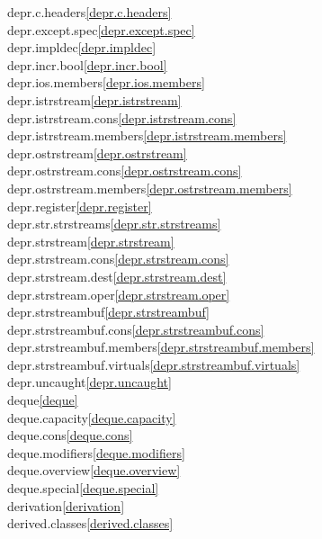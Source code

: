 \begin{multicols}{2}
depr.c.headers\quad\ref{depr.c.headers}\\
depr.except.spec\quad\ref{depr.except.spec}\\
depr.impldec\quad\ref{depr.impldec}\\
depr.incr.bool\quad\ref{depr.incr.bool}\\
depr.ios.members\quad\ref{depr.ios.members}\\
depr.istrstream\quad\ref{depr.istrstream}\\
depr.istrstream.cons\quad\ref{depr.istrstream.cons}\\
depr.istrstream.members\quad\ref{depr.istrstream.members}\\
depr.ostrstream\quad\ref{depr.ostrstream}\\
depr.ostrstream.cons\quad\ref{depr.ostrstream.cons}\\
depr.ostrstream.members\quad\ref{depr.ostrstream.members}\\
depr.register\quad\ref{depr.register}\\
depr.str.strstreams\quad\ref{depr.str.strstreams}\\
depr.strstream\quad\ref{depr.strstream}\\
depr.strstream.cons\quad\ref{depr.strstream.cons}\\
depr.strstream.dest\quad\ref{depr.strstream.dest}\\
depr.strstream.oper\quad\ref{depr.strstream.oper}\\
depr.strstreambuf\quad\ref{depr.strstreambuf}\\
depr.strstreambuf.cons\quad\ref{depr.strstreambuf.cons}\\
depr.strstreambuf.members\quad\ref{depr.strstreambuf.members}\\
depr.strstreambuf.virtuals\quad\ref{depr.strstreambuf.virtuals}\\
depr.uncaught\quad\ref{depr.uncaught}\\
deque\quad\ref{deque}\\
deque.capacity\quad\ref{deque.capacity}\\
deque.cons\quad\ref{deque.cons}\\
deque.modifiers\quad\ref{deque.modifiers}\\
deque.overview\quad\ref{deque.overview}\\
deque.special\quad\ref{deque.special}\\
derivation\quad\ref{derivation}\\
derived.classes\quad\ref{derived.classes}\\

\end{multicols}
